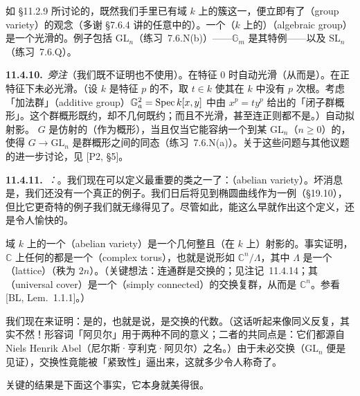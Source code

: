 如 \S11.2.9 所讨论的，既然我们手里已有域 $k$ 上的簇这一\trCategory{}，便立即有了\textbf{\trGroupVariety{}}（group variety）的观念（多谢 \S7.6.4 讲的任意\trCategory{}中的\trGroupObject）。一个（$k$ 上的）\textbf{\trAlgebraic\trGroup}（algebraic group）是一个光滑的\trGroupVariety{}。例子包括 $\mathrm{GL}_n$（\mbox{练习~7.6.N(b)}）——$\mathbb{G}_m$ 是其特例——以及 $\mathrm{SL}_n$（\mbox{练习~7.6.Q}）。

\textbf{11.4.10.}\ \emph{旁注}（我们既不证明也不使用）。\quad \trGroupVariety{}在特征 $0$ 时自动光滑（从而是\trAlgebraicGroup{}）。\trGroupVariety{}在正特征下未必光滑。（设 $k$ 是特征 $p$ 的不\trPerfectField，取 $t\in k$ 使其在 $k$ 中没有 $p$ 次根。考虑「加法群」（additive group）$\mathbb{G}_a^2=\operatorname{Spec} k[x,y]$ 中由 $x^p=ty^p$ 给出的「闭子群概形」。这个群概形既约，却不几何既约；而且不光滑，甚至连正则都不是。）\trAlgebraicGroup{}自动拟射影。\trAlgebraicGroup{} $G$ 是仿射的（作为概形），当且仅当它能容纳一个到某 $\mathrm{GL}_n$（$n\ge 0$）的\trClosedImmersion{}，使得 $G\to\mathrm{GL}_n$ 是群概形之间的同态（\mbox{练习~7.6.N(a)}）。关于这些问题与其他议题的进一步讨论，见 [P2, \S5]。

\textbf{11.4.11.}\ \emph{\trhDefinition{}：}\textbf{\trAbelianVariety{}}。\quad 我们现在可以定义\trVariety{}最重要的类之一了：\trAbelianVariety{}（abelian variety）。坏消息是，我们还没有一个真正的例子。我们日后将见到椭圆曲线作为一例（\S19.10），但比它更奇特的例子我们就无缘得见了。尽管如此，能这么早就作出这个定义，还是令人愉快的。

域 $k$ 上的一个\textbf{\trAbelian\trVariety}（abelian variety）是一个几何整且（在 $k$ 上）射影的\trAlgebraicGroup{}。事实证明，$\mathbb{C}$ 上任何\trAbelianVariety{}的\trAnalytification{}都是一个\trComplexTorus{}（complex torus），也就是说形如 $\mathbb{C}^n/\Lambda$，其中 $\Lambda$ 是一个\trLattice{}（lattice）（秩为 $2n$）。（关键想法：连通\trCompact{}\trComplex{}\trLie{}群是交换的；见注记~11.4.14；其\trUniversalCover{}（universal cover）是一个\trSimplyConnected{}（simply connected）的交换复\trLie{}群，从而是 $\mathbb{C}^n$。参看 [BL, Lem.~1.1.1]。）

我们现在来证明：\trAbelianVariety{}是\trAbelian{}的，也就是说，\trAbelianVariety{}是交换的代数\trGroupVariety{}。（这话听起来像同义反复，其实不然！形容词「阿贝尔」用于两种不同的意义；二者的共同点是：它们都源自 Niels Henrik Abel（尼尔斯·亨利克·阿贝尔）之名。）由于\trAlgebraicGroup{}未必交换（$\mathrm{GL}_n$ 便是见证），交换性竟能被「紧致性」逼出来，这就多少令人称奇了。

关键的结果是下面这个事实，它本身就美得很。


